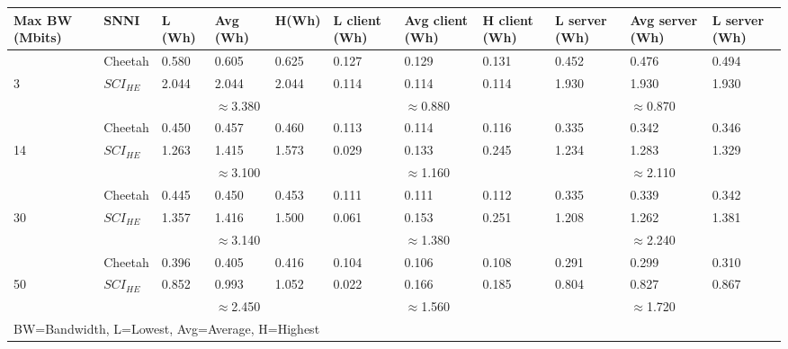 \begin{tabular}{lllllllllll}
Max BW (Mbits) & SNNI    & L (Wh) & Avg (Wh) & H(Wh) & L client (Wh) & Avg client (Wh) & H client (Wh) & L server (Wh) & Avg server (Wh) & L server (Wh) \\ \hline
               & Cheetah & 0.580  & 0.605    & 0.625 & 0.127         & 0.129           & 0.131         & 0.452         & 0.476           & 0.494         \\
3              & $SCI_{HE}$ & 2.044  & 2.044    & 2.044 & 0.114         & 0.114           & 0.114         & 1.930         & 1.930           & 1.930         \\ \cline{3-11} 
               &         &        & $\approx$3.380    &       &               & $\approx$0.880           &               &               & $\approx$0.870           &               \\ \hline
               & Cheetah & 0.450  & 0.457    & 0.460 & 0.113         & 0.114           & 0.116         & 0.335         & 0.342           & 0.346         \\
14             & $SCI_{HE}$ & 1.263  & 1.415    & 1.573 & 0.029         & 0.133           & 0.245         & 1.234         & 1.283           & 1.329         \\ \cline{3-11} 
               &         &        & $\approx$3.100    &       &               & $\approx$1.160           &               &               & $\approx$2.110           &               \\ \hline
               & Cheetah & 0.445  & 0.450    & 0.453 & 0.111         & 0.111           & 0.112         & 0.335         & 0.339           & 0.342         \\
30             & $SCI_{HE}$ & 1.357  & 1.416    & 1.500 & 0.061         & 0.153           & 0.251         & 1.208         & 1.262           & 1.381         \\ \cline{3-11} 
               &         &        & $\approx$3.140    &       &               & $\approx$1.380           &               &               & $\approx$2.240           &               \\ \hline
               & Cheetah & 0.396  & 0.405    & 0.416 & 0.104         & 0.106           & 0.108         & 0.291         & 0.299           & 0.310         \\
50             & $SCI_{HE}$ & 0.852  & 0.993    & 1.052 & 0.022         & 0.166           & 0.185         & 0.804         & 0.827           & 0.867         \\ \cline{3-11} 
               &         &        & $\approx$2.450    &       &               & $\approx$1.560           &               &               & $\approx$1.720           &               \\ \hline
\multicolumn{11}{l}{BW=Bandwidth, L=Lowest, Avg=Average, H=Highest}                                                                                     
\end{tabular}